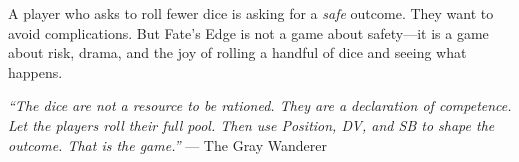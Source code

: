 A player who asks to roll fewer dice is asking for a \textit{safe} outcome. They want to avoid complications. But Fate's Edge is not a game about safety---it is a game about risk, drama, and the joy of rolling a handful of dice and seeing what happens.

\textit{``The dice are not a resource to be rationed. They are a declaration of competence. Let the players roll their full pool. Then use Position, DV, and SB to shape the outcome. That is the game.''}
--- The Gray Wanderer